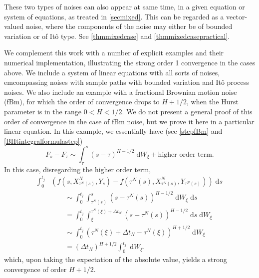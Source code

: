 \documentclass[reqno,12pt]{amsart}
\theoremstyle{plain} %
\theoremstyle{definition} %
\begin{document}
These two types of noises can also appear at same time, in a given equation or system of equations, as treated in \cref{secmixed}. This can be regarded as a vector-valued noise, where the components of the noise may either be of bounded variation or of It\^o type. See \cref{thmmixedcase} and \cref{thmmixedcasepractical}.

We complement this work with a number of explicit examples and their numerical implementation, illustrating the strong order 1 convergence in the cases above. We include a system of linear equations with all sorts of noises, emcompassing noises with sample paths with bounded variation and It\^o process noises. We also include an example with a fractional Brownian motion noise (fBm), for which the order of convergence drops to $H + 1/2$, when the Hurst parameter is in the range $0 < H < 1/2$. We do not present a general proof of this order of convergence in the case of fBm noise, but we prove it here in a particular linear equation. In this example, we essentially have (see \eqref{stepfBm} and \eqref{BHtintegralformulastep})
\[
    F_s - F_\tau \sim \int_\tau^s (s-\tau)^{H-1/2}\;\mathrm{d}W_\xi + \text{higher order term}.
\]
In this case, disregarding the higher order term,
\begin{align*}
    \int_0^{t_j} & \left( f(s, X_{\tau^N(s)}^N, Y_s) - f(\tau^N(s), X_{\tau^N(s)}^N, Y_{\tau^N(s)}) \right)\;\mathrm{d}s \\ 
    & \qquad \sim \int_0^{t_j} \int_{\tau^N(s)}^s (s-\tau^N(s))^{H-1/2} \;\mathrm{d} W_\xi\;\mathrm{d}s \\
    & \qquad = \int_0^{t_j} \int_{\xi}^{\tau^N(\xi) + \Delta t_N} (s-\tau^N(s))^{H-1/2} \;\mathrm{d}s \;\mathrm{d} W_\xi \\
    & \qquad \sim \int_0^{t_j} (\tau^N(\xi) + \Delta t_N - \tau^N(\xi))^{H+1/2} \;\mathrm{d} W_\xi \\
    & \qquad = (\Delta t_N)^{H+1/2} \int_0^{t_j} \;\mathrm{d} W_\xi.
\end{align*}
which, upon taking the expectation of the absolute value, yields a strong convergence of order $H + 1/2$.
\end{document}
